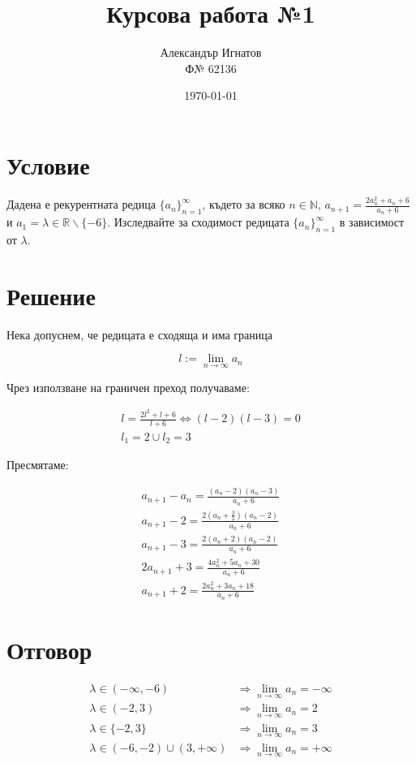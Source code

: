 \documentclass{article}
\title{Курсова работа №1}
\author{Александър Игнатов \\ Ф№ 62136 }
\date{\today}
\begin{document}
\maketitle

\section{Условие}

Дадена е рекурентната редица \( \{a_n\}_{n=1}^\infty \),
където за всяко \( n \in \mathbb{N} \),
\( a_{n+1}=\frac{2a_n^2 + a_n + 6}{a_n + 6} \) и \( a_1 = \lambda \in \mathbb{R} \backslash \{-6\} \).
Изследвайте за сходимост редицата \( \{a_n\}_{n=1}^\infty \) в зависимост от \(\lambda\).

\section{Решение}

Нека допуснем, че редицата е сходяща и има граница

\[
    l := \lim_{n \to \infty} a_n
\]

Чрез използване на граничен преход получаваме:

\begin{gather*}
    l = \frac{2l^2 + l + 6}{l + 6} \Longleftrightarrow (l-2)(l-3) = 0 \\
    l_1 = 2 \cup l_2 = 3
\end{gather*}

Пресмятаме:

\begin{gather}
    a_{n+1} - a_n = \frac{(a_n - 2)(a_n - 3)}{a_n + 6} \\
    a_{n+1} - 2 = \frac{2(a_n + \frac{3}{2})(a_n - 2)}{a_n + 6} \\
    a_{n+1} - 3 = \frac{2(a_n + 2)(a_n - 2)}{a_n + 6} \\
    2a_{n+1} + 3 = \frac{4a_n^2 + 5a_n + 30}{a_n + 6} \\
    a_{n+1} + 2 = \frac{2a_n^2 + 3a_n + 18}{a_n + 6}
\end{gather}


\section{Отговор}

\begin{align*}
\lambda \in (-\infty, -6) &\Longrightarrow \lim_{n \to \infty} a_n = -\infty \\
\lambda \in (-2, 3) &\Longrightarrow \lim_{n \to \infty} a_n = 2 \\
\lambda \in \{-2, 3\} &\Longrightarrow \lim_{n \to \infty} a_n = 3 \\
\lambda \in (-6, -2) \cup (3, +\infty) &\Longrightarrow \lim_{n \to \infty} a_n = +\infty \\
\end{align*}
\end{document}
